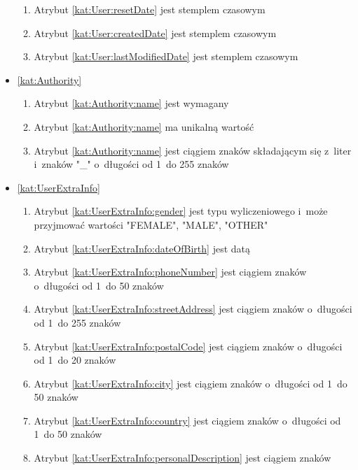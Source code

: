 \begin{itemize}[label={\textbf{Ograniczenia dla}}, wide, labelwidth=!, labelindent=0pt]
\begin{enumerate}[label={\textbf{OGR/1/\protect\twodigits{\arabic{enumi}}}}, wide, labelwidth=!, align=left, leftmargin=3cm]
        \item Atrybut \ref{kat:User:resetDate} jest stemplem czasowym
        \item Atrybut \ref{kat:User:createdDate} jest stemplem czasowym
        \item Atrybut \ref{kat:User:lastModifiedDate} jest stemplem czasowym
    \end{enumerate}
    \item\ref{kat:Authority}\mynobreakpar
    \begin{enumerate}[label={\textbf{OGR/1/\protect\twodigits{\arabic{enumi}}}}, wide, labelwidth=!, align=left, leftmargin=3cm, resume]
        \item Atrybut \ref{kat:Authority:name} jest wymagany
        \item Atrybut \ref{kat:Authority:name} ma unikalną wartość
        \item Atrybut \ref{kat:Authority:name} jest ciągiem znaków składającym się z~liter i~znaków "\_" o~długości od 1~do 255 znaków
    \end{enumerate}
    \item\ref{kat:UserExtraInfo}\mynobreakpar
    \begin{enumerate}[label={\textbf{OGR/1/\protect\twodigits{\arabic{enumi}}}}, wide, labelwidth=!, align=left, leftmargin=3cm, resume]
        \item Atrybut \ref{kat:UserExtraInfo:gender} jest typu wyliczeniowego i~może przyjmować wartości "FEMALE", "MALE", "OTHER"
        \item Atrybut \ref{kat:UserExtraInfo:dateOfBirth} jest datą
        \item Atrybut \ref{kat:UserExtraInfo:phoneNumber} jest ciągiem znaków o~długości od 1~do 50 znaków
        \item Atrybut \ref{kat:UserExtraInfo:streetAddress} jest ciągiem znaków o~długości od 1~do 255 znaków
        \item Atrybut \ref{kat:UserExtraInfo:postalCode} jest ciągiem znaków o~długości od 1~do 20 znaków
        \item Atrybut \ref{kat:UserExtraInfo:city} jest ciągiem znaków o~długości od 1~do 50 znaków
        \item Atrybut \ref{kat:UserExtraInfo:country} jest ciągiem znaków o~długości od 1~do 50 znaków
        \item Atrybut \ref{kat:UserExtraInfo:personalDescription} jest ciągiem znaków
    \end{enumerate}


\end{itemize}
